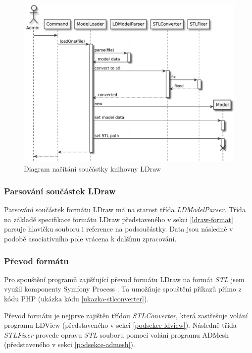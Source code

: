 \begin{figure}[htbp]
    \centering
    \includegraphics[width=\textwidth,height=\textheight,keepaspectratio]{pdfs/loading.pdf}
    \caption{Diagram načítání součástky knihovny LDraw \label{schema-nacitani}}
\end{figure}

\subsubsection*{Parsování součástek LDraw}
Parsování součástek formátu LDraw má na starost třída \textit{LDModelParser}. Třída na základě specifikace formátu LDraw představeného v sekci \ref{ldraw-format} parsuje hlavičku souboru i reference na podsoučástky. Data jsou následně v podobě asociativního pole vrácena k dalšímu zpracování.

\subsubsection*{Převod formátu}
Pro spouštění programů zajišťující převod formátu LDraw na formát \textit{\gls{STL}} jsem využil komponenty Symfony Process \autocite{symfony:process}. Ta umožňuje spouštění příkazů přímo z kódu PHP (ukázka kódu \ref{ukazka-stlconverter}).

Převod formátu je nejprve zajištěn třídou \textit{STLConverter}, která zastřešuje volání programu LDView (představeného v sekci \ref{podsekce-ldview}). Následně třída \textit{STLFixer} provede opravu \textit{\gls{STL}} souboru pomocí volání programu ADMesh (představeného v sekci \ref{podsekce-admesh}).


